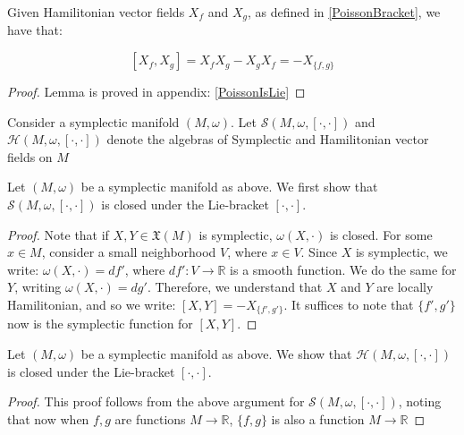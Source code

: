 \begin{lemma}

Given Hamilitonian vector fields $X_{f}$ and $X_{g}$, as defined in \ref{PoissonBracket}, we have that:

$$[X_{f}, X_{g}] = X_{f} X_{g} - X_{g} X_{f} = -X_{\{f, g \}}$$ 
\end{lemma}

\begin{proof}
Lemma is proved in appendix: \ref{PoissonIsLie}
\end{proof}

\begin{defn}
Consider a symplectic manifold $(M, \omega)$. Let $\mathcal{S}(M, \omega, [\cdot, \cdot])$ and $\mathcal{H}(M, \omega, [\cdot, \cdot])$ denote the algebras of Symplectic and Hamilitonian vector fields on $M$
\end{defn}

\begin{lemma}

Let $(M, \omega)$ be a symplectic manifold as above. We first show that $\mathcal{S}(M, \omega, [\cdot, \cdot])$ is closed under the Lie-bracket $[\cdot, \cdot]$. 
\end{lemma}

\begin{proof}
Note that if $X, Y \in \mathfrak{X}(M)$ is symplectic, $\omega(X, \cdot)$ is closed. For some $x \in M$, consider a small neighborhood $V$, where $x \in V$. Since $X$ is symplectic, we write: $\omega(X, \cdot) = df'$, where $df': V \to \mathbb{R}$ is a smooth function. We do the same for $Y$, writing $\omega(X, \cdot) = dg'$. Therefore, we understand that $X$ and $Y$ are locally Hamilitonian, and so we write: $[X, Y] = -X_{\{f', g' \}}$. It suffices to note that $\{f', g' \}$ now is the symplectic function for $[X, Y]$. 
\end{proof}

\begin{lemma}

Let $(M, \omega)$ be a symplectic manifold as above. We show that $\mathcal{H}(M, \omega, [\cdot, \cdot])$ is closed under the Lie-bracket $[\cdot, \cdot]$. 
\end{lemma}

\begin{proof}
This proof follows from the above argument for $\mathcal{S}(M, \omega, [\cdot, \cdot])$, noting that now when $f, g$ are functions $M \to \mathbb{R}$, $\{f, g \}$ is also a function $M \to \mathbb{R}$
\end{proof}

